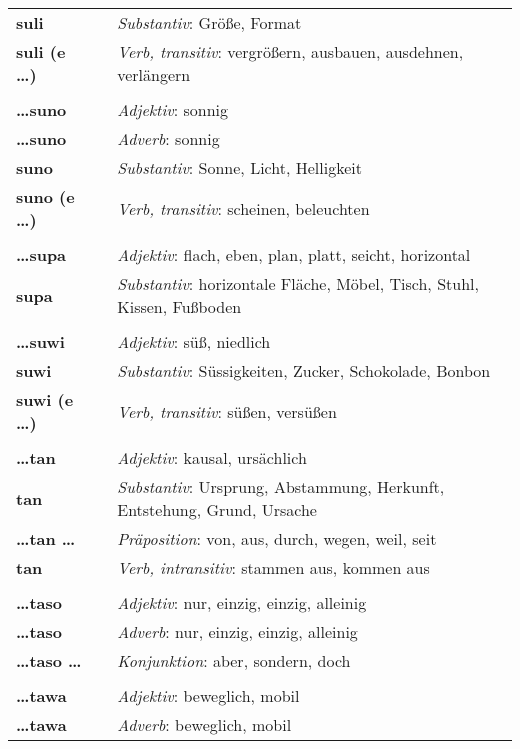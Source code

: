 \begin{supertabular}{p{2,5cm}|ll}
\textbf{suli} && \textit{Substantiv}: Größe, Format \\ 
\textbf{suli (e \dots)} && \textit{Verb, transitiv}: vergrößern, ausbauen, ausdehnen, verlängern \\ 
 && \\ %
\textbf{\dots suno} && \textit{Adjektiv}: sonnig \\ 
\textbf{\dots suno} && \textit{Adverb}: sonnig \\ 
\textbf{suno} && \textit{Substantiv}: Sonne, Licht, Helligkeit \\ 
\textbf{suno (e \dots)} && \textit{Verb, transitiv}: scheinen, beleuchten \\ 
 && \\ %
\textbf{\dots supa} && \textit{Adjektiv}: flach, eben, plan, platt, seicht, horizontal \\ 
\textbf{supa} && \textit{Substantiv}: horizontale Fläche, Möbel, Tisch, Stuhl, Kissen, Fußboden \\ 
 && \\ %
\textbf{\dots suwi} && \textit{Adjektiv}: süß, niedlich \\ 
\textbf{suwi} && \textit{Substantiv}: Süssigkeiten, Zucker, Schokolade, Bonbon \\ 
\textbf{suwi (e \dots)} && \textit{Verb, transitiv}: süßen, versüßen \\ 
 && \\ %
\textbf{\dots tan} && \textit{Adjektiv}: kausal, ursächlich \\ 
\textbf{tan} && \textit{Substantiv}: Ursprung, Abstammung, Herkunft, Entstehung, Grund, Ursache \\ 
\textbf{\dots tan \dots} && \textit{Präposition}: von, aus, durch, wegen, weil, seit \\ 
\textbf{tan} && \textit{Verb, intransitiv}: stammen aus, kommen aus \\ 
 && \\ %
\textbf{\dots taso} && \textit{Adjektiv}: nur, einzig, einzig, alleinig \\ 
\textbf{\dots taso} && \textit{Adverb}: nur, einzig, einzig, alleinig \\ 
\textbf{\dots taso \dots} && \textit{Konjunktion}: aber, sondern, doch \\ 
 && \\ %
\textbf{\dots tawa} && \textit{Adjektiv}: beweglich, mobil \\ 
\textbf{\dots tawa} && \textit{Adverb}: beweglich, mobil \\ 

\end{supertabular}

